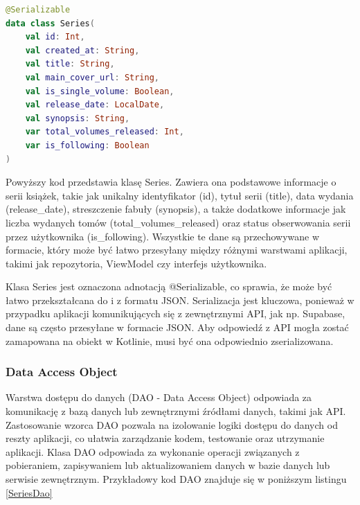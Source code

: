 \documentclass[12pt,twoside]{article}
\begin{document}
\begin{lstlisting}[language=Kotlin,caption=Data Transfer Object Series, label={SeriesDTO}]
@Serializable
data class Series(
    val id: Int,
    val created_at: String,
    val title: String,
    val main_cover_url: String,
    val is_single_volume: Boolean,
    val release_date: LocalDate,
    val synopsis: String,
    var total_volumes_released: Int,
    var is_following: Boolean
)
\end{lstlisting}
Powyższy kod przedstawia klasę Series. Zawiera ona podstawowe informacje o serii książek, takie jak unikalny 
identyfikator (id), tytuł serii (title), data wydania (release\_date), streszczenie fabuły (synopsis), a także 
dodatkowe informacje jak liczba wydanych tomów (total\_volumes\_released) oraz status obserwowania serii przez 
użytkownika (is\_following). Wszystkie te dane są przechowywane w formacie, który może być łatwo przesyłany między 
różnymi warstwami aplikacji, takimi jak repozytoria, ViewModel czy interfejs użytkownika.

Klasa Series jest oznaczona adnotacją @Serializable, co sprawia, że może być łatwo przekształcana do i z formatu 
JSON. Serializacja jest kluczowa, ponieważ w przypadku aplikacji komunikujących się z zewnętrznymi API, jak np. 
Supabase, dane są często przesyłane w formacie JSON. Aby odpowiedź z API mogła zostać zamapowana na obiekt w 
Kotlinie, musi być ona odpowiednio zserializowana.

\subsubsection{Data Access Object}
Warstwa dostępu do danych (DAO - Data Access Object) odpowiada za komunikację z bazą danych lub zewnętrznymi 
źródłami danych, takimi jak API. Zastosowanie wzorca DAO pozwala na izolowanie logiki dostępu do danych od reszty 
aplikacji, co ułatwia zarządzanie kodem, testowanie oraz utrzymanie aplikacji. Klasa DAO odpowiada za wykonanie 
operacji związanych z pobieraniem, zapisywaniem lub aktualizowaniem danych w bazie danych lub serwisie zewnętrznym.
Przykładowy kod DAO znajduje się w poniższym listingu \ref{SeriesDao}
\end{document}
